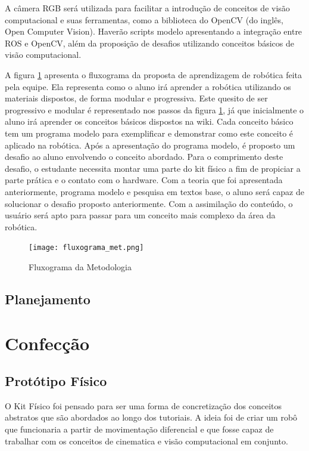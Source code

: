 A câmera RGB será utilizada para facilitar a introdução de conceitos de visão computacional e suas ferramentas, como a biblioteca do OpenCV (do inglês, Open Computer Vision). Haverão scripts modelo apresentando a integração entre ROS e OpenCV, além da proposição de desafios utilizando conceitos básicos de visão computacional.

A figura \ref{img:flu_metod} apresenta o fluxograma da proposta de aprendizagem de robótica feita pela equipe. Ela representa como o aluno irá aprender a robótica utilizando os materiais dispostos, de forma modular e progressiva. 
Este quesito de ser progressivo e modular é representado nos passos da figura \ref{img:flu_metod}, já que inicialmente o aluno irá aprender os conceitos básicos dispostos na wiki. Cada conceito básico tem um programa modelo para exemplificar e demonstrar como este conceito é aplicado na robótica. Após a apresentação do programa modelo, é proposto um desafio ao aluno envolvendo o conceito abordado. Para o comprimento deste desafio, o estudante necessita montar uma parte do kit físico a fim de propiciar a parte prática e o contato com o hardware. Com a teoria que foi apresentada anteriormente, programa modelo e pesquisa em textos base, o aluno será capaz de solucionar o desafio proposto anteriormente. Com a assimilação do conteúdo, o usuário será apto para passar para um conceito mais complexo da área da robótica.


\begin{figure}[h!]                                                
	\centering        
	\texttt{[image: fluxograma\_met.png]}            
	\caption{Fluxograma da Metodologia}        
	\label{img:flu_metod}    
\end{figure}

\subsection{Planejamento}

\section{Confecção}
\subsection{Protótipo Físico}
O Kit Físico foi pensado para ser uma forma de concretização dos conceitos abstratos que são abordados ao longo dos tutoriais. A ideia foi de criar um robô que funcionaria a partir de movimentação diferencial e que fosse capaz de trabalhar com os conceitos de cinematica e visão computacional em conjunto.

